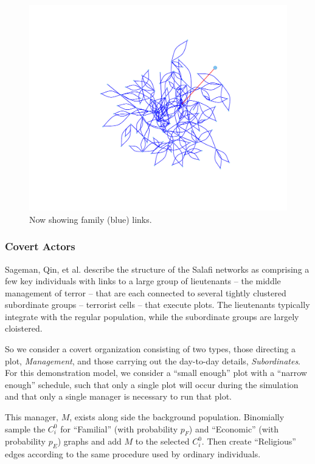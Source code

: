 \documentclass{article}
\newenvironment{rnwfig}[0]{\begin{figure}\begin{center}}{\end{center}\end{figure}}
\begin{document}
\begin{rnwfig}
\includegraphics{manuscript-familyAlt}
\caption{Now showing family (blue) links.}
\end{rnwfig}

\subsubsection*{Covert Actors}
Sageman, Qin, et al. describe the structure of the Salafi networks as comprising a few key individuals with links to a large group of lieutenants -- the middle management of terror -- that are each connected to several tightly clustered subordinate groups -- terrorist cells -- that execute plots.  The lieutenants typically integrate with the regular population, while the subordinate groups are largely cloistered.

So we consider a covert organization consisting of two types, those directing a plot, {\em Management}, and those carrying out the day-to-day details, {\em Subordinates}.  For this demonstration model, we consider a ``small enough'' plot with a ``narrow enough'' schedule, such that only a single plot will occur during the simulation and that only a single manager is necessary to run that plot.

This manager, $M$, exists along side the background population.  Binomially sample the $C_i^0$ for ``Familial'' (with probability $p_F$) and ``Economic'' (with probability $p_E$) graphs and add $M$ to the selected $C_i^0$.  Then create ``Religious'' edges according to the same procedure used by ordinary individuals.
\end{document}
